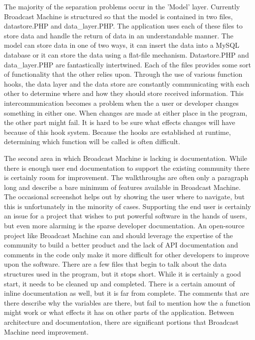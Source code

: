 \documentclass[a4paper,12pt]{report}
\begin{document}
The majority of the separation problems occur in the 'Model' layer.
Currently Broadcast Machine is structured so that the model is contained in two files, datastore.PHP and data\_layer.PHP.
The application uses each of these files to store data and handle the return of data in an understandable manner.
The model can store data in one of two ways, it can insert the data into a MySQL database or it can store the data using a flat-file mechanism.
Datastore.PHP and data\_layer.PHP are fantastically intertwined.
Each of the files provides some sort of functionality that the other relies upon.
Through the use of various function hooks, the data layer and the data store are constantly communicating with each other to determine where and how they should store received information.
This intercommunication becomes a problem when the a user or developer changes something in either one.
When changes are made at either place in the program, the other part might fail.
It is hard to be sure what effects changes will have because of this hook system.
Because the hooks are established at runtime, determining which function will be called is often difficult.

The second area in which Broadcast Machine is lacking is documentation.
While there is enough user end documentation to support the existing community there is certainly room for improvement.
The walkthroughs are often only a paragraph long and describe a bare minimum of features available in Broadcast Machine.
The occasional screenshot helps out by showing the user where to navigate, but this is unfortunately in the minority of cases.
Supporting the end user is certainly an issue for a project that wishes to put powerful software in the hands of users, but even more alarming is the sparse developer documentation.
An open-source project like Broadcast Machine can and should leverage the expertise of the community to build a better product and the lack of API documentation and comments in the code only make it more difficult for other developers to improve upon the software.
There are a few files that begin to talk about the data structures used in the program, but it stops short.
While it is certainly a good start, it needs to be cleaned up and completed. There is a certain amount of inline documentation as well, but it is far from complete.
The comments that are there describe why the variables are there, but fail to mention how the a function might work or what effects it has on other parts of the application.
Between architecture and documentation, there are significant portions that Broadcast Machine need improvement.
\end{document}
